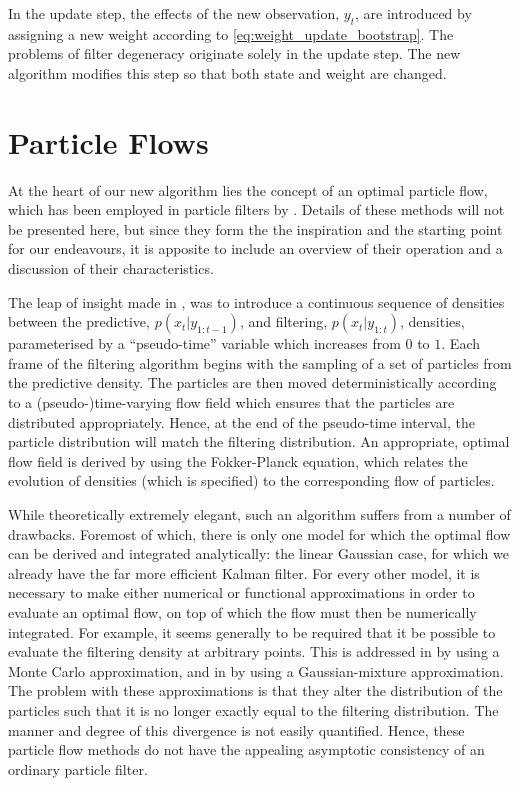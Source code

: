 \documentclass[a4paper,10pt]{article}
\begin{document}
In the update step, the effects of the new observation, $y_t$, are introduced by assigning a new weight according to \eqref{eq:weight_update_bootstrap}. The problems of filter degeneracy originate solely in the update step. The new algorithm modifies this step so that both state and weight are changed.



\section{Particle Flows}

At the heart of our new algorithm lies the concept of an optimal particle flow, which has been employed in particle filters by \cite{Daum2008,Daum2011d,Reich2011}. Details of these methods will not be presented here, but since they form the the inspiration and the starting point for our endeavours, it is apposite to include an overview of their operation and a discussion of their characteristics.

The leap of insight made in \cite{Daum2008}, was to introduce a continuous sequence of densities between the predictive, $p(x_t|y_{1:t-1})$, and filtering, $p(x_t|y_{1:t})$, densities, parameterised by a ``pseudo-time'' variable which increases from $0$ to $1$. Each frame of the filtering algorithm begins with the sampling of a set of particles from the predictive density. The particles are then moved deterministically according to a (pseudo-)time-varying flow field which ensures that the particles are distributed appropriately. Hence, at the end of the pseudo-time interval, the particle distribution will match the filtering distribution. An appropriate, optimal flow field is derived by using the Fokker-Planck equation, which relates the evolution of densities (which is specified) to the corresponding flow of particles.

While theoretically extremely elegant, such an algorithm suffers from a number of drawbacks. Foremost of which, there is only one model for which the optimal flow can be derived and integrated analytically: the linear Gaussian case, for which we already have the far more efficient Kalman filter. For every other model, it is necessary to make either numerical or functional approximations in order to evaluate an optimal flow, on top of which the flow must then be numerically integrated. For example, it seems generally to be required that it be possible to evaluate the filtering density at arbitrary points. This is addressed in \cite{Daum2012} by using a Monte Carlo approximation, and in \cite{Reich2012a} by using a Gaussian-mixture approximation. The problem with these approximations is that they alter the distribution of the particles such that it is no longer exactly equal to the filtering distribution. The manner and degree of this divergence is not easily quantified. Hence, these particle flow methods do not have the appealing asymptotic consistency of an ordinary particle filter.
\end{document}
